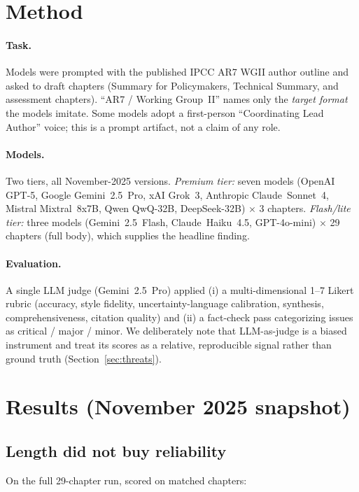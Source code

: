 \documentclass[11pt]{article}
\begin{document}
\section{Method}
\paragraph{Task.} Models were prompted with the published IPCC AR7 WGII author outline
and asked to draft chapters (Summary for Policymakers, Technical Summary, and
assessment chapters). ``AR7 / Working Group~II'' names only the \emph{target format}
the models imitate. Some models adopt a first-person ``Coordinating Lead Author''
voice; this is a prompt artifact, not a claim of any role.

\paragraph{Models.} Two tiers, all November-2025 versions. \emph{Premium tier:} seven
models (OpenAI GPT-5, Google Gemini~2.5~Pro, xAI Grok~3, Anthropic Claude~Sonnet~4,
Mistral Mixtral~8x7B, Qwen QwQ-32B, DeepSeek-32B) $\times$ 3 chapters.
\emph{Flash/lite tier:} three models (Gemini~2.5~Flash, Claude~Haiku~4.5,
GPT-4o-mini) $\times$ 29 chapters (full body), which supplies the headline finding.

\paragraph{Evaluation.} A single LLM judge (Gemini~2.5~Pro) applied (i) a multi-dimensional
1--7 Likert rubric (accuracy, style fidelity, uncertainty-language calibration,
synthesis, comprehensiveness, citation quality) and (ii) a fact-check pass categorizing
issues as critical / major / minor. We deliberately note that LLM-as-judge is a biased
instrument \citep{zheng2023judging, panickssery2024llm} and treat its scores as a
relative, reproducible signal rather than ground truth (Section~\ref{sec:threats}).

\section{Results (November 2025 snapshot)}
\subsection{Length did not buy reliability}
On the full 29-chapter run, scored on matched chapters:
\end{document}
